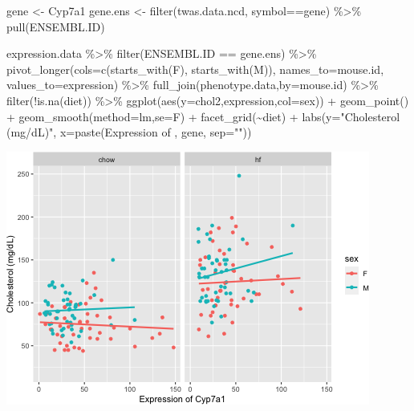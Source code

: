 \documentclass[
]{article}
\newenvironment{Shaded}{\begin{snugshade}}{\end{snugshade}}
\newcommand{\AttributeTok}[1]{\textcolor[rgb]{0.77,0.63,0.00}{#1}}
\newcommand{\FunctionTok}[1]{\textcolor[rgb]{0.00,0.00,0.00}{#1}}
\newcommand{\NormalTok}[1]{#1}
\newcommand{\OtherTok}[1]{\textcolor[rgb]{0.56,0.35,0.01}{#1}}
\newcommand{\SpecialCharTok}[1]{\textcolor[rgb]{0.00,0.00,0.00}{#1}}
\newcommand{\StringTok}[1]{\textcolor[rgb]{0.31,0.60,0.02}{#1}}
\begin{document}
\begin{Shaded}
\begin{Highlighting}[]
\NormalTok{gene }\OtherTok{\textless{}{-}} \StringTok{\textquotesingle{}Cyp7a1\textquotesingle{}}
\NormalTok{gene.ens }\OtherTok{\textless{}{-}} \FunctionTok{filter}\NormalTok{(twas.data.ncd, symbol}\SpecialCharTok{==}\NormalTok{gene) }\SpecialCharTok{\%\textgreater{}\%} \FunctionTok{pull}\NormalTok{(ENSEMBL.ID)}

\NormalTok{expression.data }\SpecialCharTok{\%\textgreater{}\%}
  \FunctionTok{filter}\NormalTok{(ENSEMBL.ID }\SpecialCharTok{==}\NormalTok{ gene.ens) }\SpecialCharTok{\%\textgreater{}\%}
  \FunctionTok{pivot\_longer}\NormalTok{(}\AttributeTok{cols=}\FunctionTok{c}\NormalTok{(}\FunctionTok{starts\_with}\NormalTok{(}\StringTok{\textquotesingle{}F\textquotesingle{}}\NormalTok{),}
                      \FunctionTok{starts\_with}\NormalTok{(}\StringTok{\textquotesingle{}M\textquotesingle{}}\NormalTok{)),}
               \AttributeTok{names\_to=}\StringTok{\textquotesingle{}mouse.id\textquotesingle{}}\NormalTok{,}
               \AttributeTok{values\_to=}\StringTok{\textquotesingle{}expression\textquotesingle{}}\NormalTok{) }\SpecialCharTok{\%\textgreater{}\%}
  \FunctionTok{full\_join}\NormalTok{(phenotype.data,}\AttributeTok{by=}\StringTok{\textquotesingle{}mouse.id\textquotesingle{}}\NormalTok{) }\SpecialCharTok{\%\textgreater{}\%}
  \FunctionTok{filter}\NormalTok{(}\SpecialCharTok{!}\FunctionTok{is.na}\NormalTok{(diet)) }\SpecialCharTok{\%\textgreater{}\%}
  \FunctionTok{ggplot}\NormalTok{(}\FunctionTok{aes}\NormalTok{(}\AttributeTok{y=}\NormalTok{chol2,expression,}\AttributeTok{col=}\NormalTok{sex)) }\SpecialCharTok{+}
  \FunctionTok{geom\_point}\NormalTok{() }\SpecialCharTok{+}
  \FunctionTok{geom\_smooth}\NormalTok{(}\AttributeTok{method=}\StringTok{\textquotesingle{}lm\textquotesingle{}}\NormalTok{,}\AttributeTok{se=}\NormalTok{F) }\SpecialCharTok{+}
  \FunctionTok{facet\_grid}\NormalTok{(}\SpecialCharTok{\textasciitilde{}}\NormalTok{diet) }\SpecialCharTok{+}
  \FunctionTok{labs}\NormalTok{(}\AttributeTok{y=}\StringTok{"Cholesterol (mg/dL)"}\NormalTok{,}
       \AttributeTok{x=}\FunctionTok{paste}\NormalTok{(}\StringTok{\textquotesingle{}Expression of \textquotesingle{}}\NormalTok{, gene, }\AttributeTok{sep=}\StringTok{""}\NormalTok{))}
\end{Highlighting}
\end{Shaded}

\includegraphics{figures/cyp7a1-associations-1.png}
\end{document}
